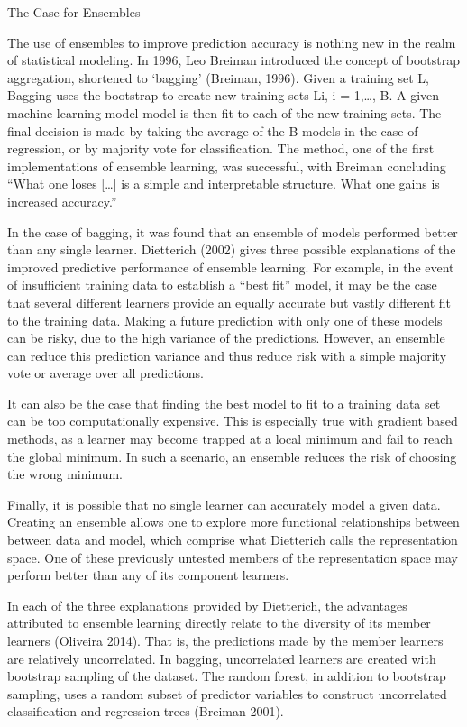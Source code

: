 \documentclass [M] {uclathes}
\begin{document}
The Case for Ensembles

The use of ensembles to improve prediction accuracy is nothing new in the realm of statistical modeling. In 1996, Leo Breiman introduced the concept of bootstrap aggregation, shortened to ‘bagging’ (Breiman, 1996). Given a training set L, Bagging uses the bootstrap to create  new training sets Li, i = 1,…, B. A given machine learning model model is then fit to each of the new training sets. The final decision is made by taking the average of the B models in the case of regression, or by majority vote for classification. The method, one of the first implementations of ensemble learning, was successful, with Breiman concluding “What one loses […] is a simple and interpretable structure. What one gains is increased accuracy.”

In the case of bagging, it was found that an ensemble of models performed better than any single learner. Dietterich (2002) gives three possible explanations of the improved predictive performance of ensemble learning. For example, in the event of insufficient training data to establish a “best fit” model, it may be the case that several different learners provide an equally accurate but vastly different fit to the training data. Making a future prediction with only one of these models can be risky, due to the high variance of the predictions. However, an ensemble can reduce this prediction variance and thus reduce risk with a simple majority vote or average over all predictions.
	
It can also be the case that finding the best model to fit to a training data set can be too computationally expensive. This is especially true with gradient based methods, as a learner may become trapped at a local minimum and fail to reach the global minimum. In such a scenario, an ensemble reduces the risk of choosing the wrong minimum.
	
Finally, it is possible that no single learner can accurately model a given data. Creating an ensemble allows one to explore more functional relationships between between data and model, which comprise what Dietterich calls the representation space. One of these previously untested members of the representation space may perform better than any of its component learners.

In each of the three explanations provided by Dietterich, the advantages attributed to ensemble learning directly relate to the diversity of its member learners (Oliveira 2014). That is, the predictions made by the member learners are relatively uncorrelated. In bagging, uncorrelated learners are created with bootstrap sampling of the dataset. The random forest, in addition to bootstrap sampling, uses a random subset of predictor variables to construct uncorrelated classification and regression trees (Breiman 2001).
\end{document}
